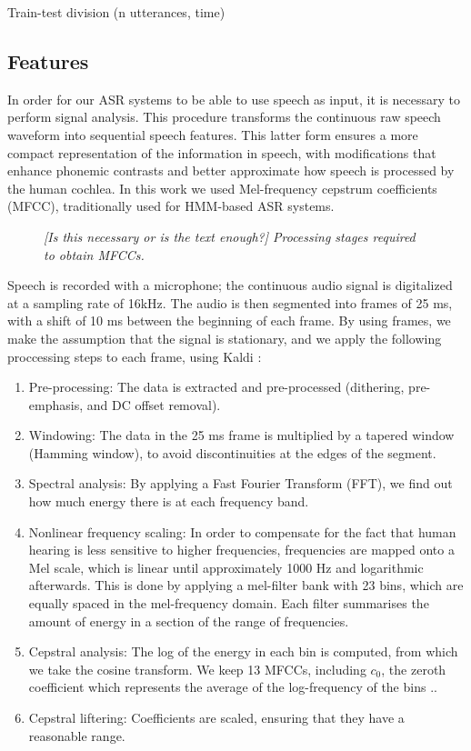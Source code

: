 \begin{itemize}
{\color{red}\item Train-test division (n utterances, time)}
\end{itemize}

\subsection{Features}
In order for our ASR systems to be able to use speech as input, it is necessary to perform signal analysis. This procedure transforms the continuous raw speech waveform into sequential speech features. This latter form ensures a more compact representation of the information in speech, with modifications that enhance phonemic contrasts and better approximate how speech is processed by the human cochlea. In this work we used Mel-frequency cepstrum coefficients (MFCC), traditionally used for HMM-based ASR systems.

\begin{figure}[htb]
\centering
\caption{{\color{red}\textit{[Is this necessary or is the text enough?] Processing stages required to obtain MFCCs.}}}
\label{fig:hmm_architecture}
\end{figure}

Speech is recorded with a microphone; the continuous audio signal is digitalized at a sampling rate of 16kHz.
The audio is then segmented into frames of 25 ms, with a shift of 10 ms between the beginning of each frame. By using frames, we make the assumption that the signal is stationary, and we apply the following proccessing steps to each frame, using Kaldi \cite{povey2011}:

\begin{enumerate}
\item Pre-processing: The data is extracted and pre-processed (dithering, pre-emphasis, and DC offset removal).
\item Windowing: The data in the 25 ms frame is multiplied by a tapered window (Hamming window), to avoid discontinuities at the edges of the segment.
\item Spectral analysis: By applying a Fast Fourier Transform (FFT), we find out how much energy there is at each frequency band.
\item Nonlinear frequency scaling: In order to compensate for the fact that human hearing is less sensitive to higher frequencies, frequencies are mapped onto a Mel scale, which is linear until approximately 1000 Hz and logarithmic afterwards. This is done by applying a mel-filter bank with 23 bins, which are equally spaced in the mel-frequency domain. Each filter summarises the amount of energy in a section of the range of frequencies. 
\item Cepstral analysis: The log of the energy in each bin is computed, from which we take the cosine transform. We keep 13 MFCCs, including $c_{0}$, the zeroth coefficient which represents the average of the log-frequency of the bins \cite{galesyoung2007}..
  \item {\color{red}Cepstral liftering: Coefficients are scaled, ensuring that they have a reasonable range.}
\end{enumerate}

